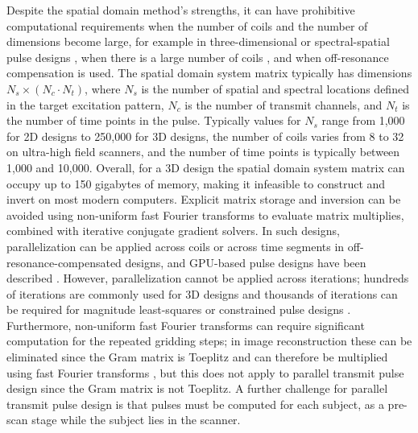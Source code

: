 \par Despite the spatial domain method's strengths, 
it can have prohibitive computational requirements when the number of coils and the number of dimensions become large, 
for example in three-dimensional \cite{malik2012tailored,davids2016fast} or spectral-spatial pulse designs \cite{stenger2000three,setsompop2009,Malik:2010aa,yang2010four}, 
when there is a large number of coils \cite{orzada:2019},
and when off-resonance compensation is used.  
The spatial domain system matrix typically has dimensions $N_s \times (N_c \cdot N_t)$, 
where $N_s$ is the number of spatial and spectral locations defined in the target excitation pattern,
$N_c$ is the number of transmit channels, and $N_t$ is the number of time points in the pulse.
Typically values for $N_s$ range from 1,000 for 2D designs to 250,000 for 3D designs,
the number of coils varies from 8 to 32 on ultra-high field scanners,
and the number of time points is typically between 1,000 and 10,000. 
Overall, for a 3D design the spatial domain system matrix can occupy up to 150 gigabytes of memory,
making it infeasible to construct and invert on most modern computers.
Explicit matrix storage and inversion can be avoided using non-uniform fast Fourier transforms to evaluate matrix multiplies,
combined with iterative conjugate gradient solvers. 
In such designs, parallelization can be applied across coils or across time segments in off-resonance-compensated designs,
and GPU-based pulse designs have been described \cite{deng:2011}. 
However, parallelization cannot be applied across iterations;
hundreds of iterations are commonly used for 3D designs and thousands of iterations can be required for 
magnitude least-squares \cite{setsompop2008magnitude} 
or constrained pulse designs \cite{brunner2010optimal,hoyos:tmi:2014}. 
Furthermore, non-uniform fast Fourier transforms can require significant computation for the repeated gridding steps; 
in image reconstruction these can be eliminated since the Gram matrix is Toeplitz and can therefore be multiplied using fast Fourier transforms \cite{fessler2005toeplitz},
but this does not apply to parallel transmit pulse design since the Gram matrix is not Toeplitz. 
A further challenge for parallel transmit pulse design is that pulses must be computed for each subject,
as a pre-scan stage while the subject lies in the scanner. 

